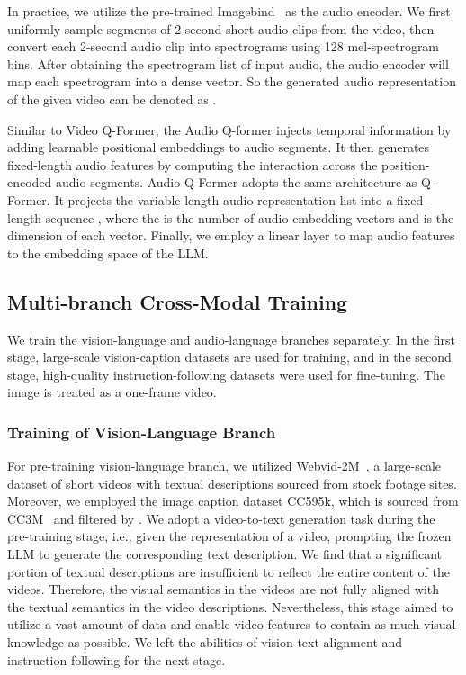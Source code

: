 \documentclass[11pt]{article}
\begin{document}
In practice, we utilize the pre-trained Imagebind~\citep{girdhar2023imagebind} as the audio encoder. We first uniformly sample  segments of 2-second short audio clips from the video, then convert each 2-second audio clip into spectrograms using 128 mel-spectrogram bins. After obtaining the spectrogram list of input audio, the audio encoder will map each spectrogram into a dense vector. So the generated audio representation of the given video can be denoted as  . 

Similar to Video Q-Former, the Audio Q-former injects temporal information by adding learnable positional embeddings to audio segments. It then generates fixed-length audio features by computing the interaction across the position-encoded audio segments.  Audio Q-Former adopts the same architecture as Q-Former. It projects the variable-length audio representation list  into a fixed-length sequence , where the  is the number of audio embedding vectors and  is the dimension of each vector. Finally, we employ a linear layer to map audio features to the embedding space of the LLM.





\subsection{Multi-branch Cross-Modal Training}
We train the vision-language and audio-language branches separately. In the first stage, large-scale vision-caption datasets are used for training, and in the second stage, high-quality instruction-following datasets were used for fine-tuning. The image is treated as a one-frame video.

\subsubsection{Training of Vision-Language Branch}
For pre-training vision-language branch, we utilized Webvid-2M~\citep{Bain21}, a large-scale dataset of short videos with textual descriptions sourced from stock footage sites. Moreover, we employed the image caption dataset CC595k, which is sourced from CC3M~\citep{sharma-etal-2018-conceptual} and filtered by \citet{liu2023visualit}. We adopt a video-to-text generation task during the pre-training stage, i.e., given the representation of a video, prompting the frozen LLM to generate the corresponding text description. We find that a significant portion of textual descriptions are insufficient to reflect the entire content of the videos. Therefore, the visual semantics in the videos are not fully aligned with the textual semantics in the video descriptions. Nevertheless, this stage aimed to utilize a vast amount of data and enable video features to contain as much visual knowledge as possible. We left the abilities of vision-text alignment and instruction-following for the next stage.
\end{document}

